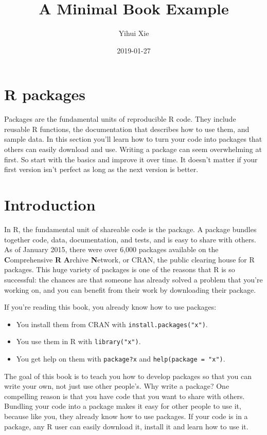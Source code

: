 \documentclass[]{book}
\title{A Minimal Book Example}
\author{Yihui Xie}
\date{2019-01-27}
\providecommand{\tightlist}{%
  \setlength{\itemsep}{0pt}\setlength{\parskip}{0pt}}
\begin{document}
\maketitle

{
\setcounter{tocdepth}{1}
\tableofcontents
}
\hypertarget{r-packages}{%
\chapter*{R packages}\label{r-packages}}

Packages are the fundamental units of reproducible R code. They include reusable R functions, the documentation that describes how to use them, and sample data. In this section you'll learn how to turn your code into packages that others can easily download and use. Writing a package can seem overwhelming at first. So start with the basics and improve it over time. It doesn't matter if your first version isn't perfect as long as the next version is better.

\hypertarget{intro-why}{%
\chapter{Introduction}\label{intro-why}}

In R, the fundamental unit of shareable code is the package. A package bundles together code, data, documentation, and tests, and is easy to share with others. As of January 2015, there were over 6,000 packages available on the \textbf{C}omprehensive \textbf{R} \textbf{A}rchive \textbf{N}etwork, or CRAN, the public clearing house for R packages. This huge variety of packages is one of the reasons that R is so successful: the chances are that someone has already solved a problem that you're working on, and you can benefit from their work by downloading their package.

If you're reading this book, you already know how to use packages:

\begin{itemize}
\tightlist
\item
  You install them from CRAN with \texttt{install.packages("x")}.
\item
  You use them in R with \texttt{library("x")}.
\item
  You get help on them with \texttt{package?x} and \texttt{help(package\ =\ "x")}.
\end{itemize}

The goal of this book is to teach you how to develop packages so that you can write your own, not just use other people's. Why write a package? One compelling reason is that you have code that you want to share with others. Bundling your code into a package makes it easy for other people to use it, because like you, they already know how to use packages. If your code is in a package, any R user can easily download it, install it and learn how to use it.
\end{document}
